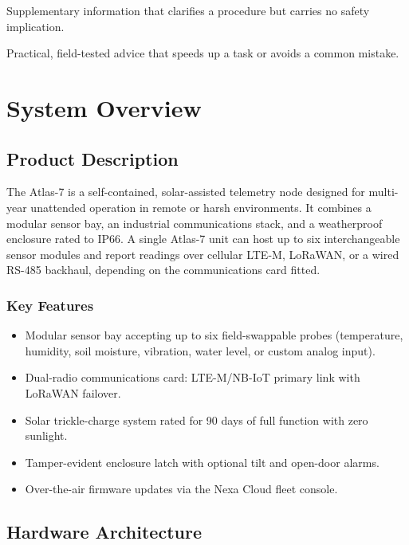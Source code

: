 \documentclass[11pt,a4paper,oneside,headings=big,chapterprefix=true]{scrreprt}
\begin{document}
\begin{notebox}
Supplementary information that clarifies a procedure but carries no safety implication.
\end{notebox}

\begin{tipbox}
Practical, field-tested advice that speeds up a task or avoids a common mistake.
\end{tipbox}

\chapter{System Overview}
\label{ch:overview}

\section{Product Description}

The Atlas-7 is a self-contained, solar-assisted telemetry node designed for multi-year unattended operation in remote or harsh environments. It combines a modular sensor bay, an industrial communications stack, and a weatherproof enclosure rated to IP66. A single Atlas-7 unit can host up to six interchangeable sensor modules and report readings over cellular LTE-M, LoRaWAN, or a wired RS-485 backhaul, depending on the communications card fitted.

\subsection*{Key Features}
\begin{itemize}
  \item Modular sensor bay accepting up to six field-swappable probes (temperature, humidity, soil moisture, vibration, water level, or custom analog input).
  \item Dual-radio communications card: LTE-M/NB-IoT primary link with LoRaWAN failover.
  \item Solar trickle-charge system rated for 90 days of full function with zero sunlight.
  \item Tamper-evident enclosure latch with optional tilt and open-door alarms.
  \item Over-the-air firmware updates via the Nexa Cloud fleet console.
\end{itemize}

\section{Hardware Architecture}
\end{document}
